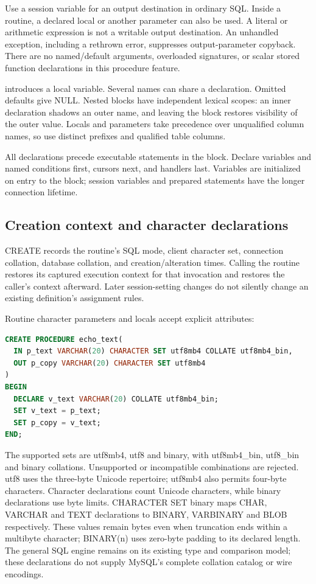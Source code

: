 Use a session variable for an output destination in ordinary SQL. Inside a
routine, a declared local or another parameter can also be used. A literal or
arithmetic expression is not a writable output destination. An unhandled
exception, including a rethrown error, suppresses output-parameter copyback.
There are no named/default arguments, overloaded signatures, or scalar stored
function declarations in this procedure feature.

 introduces a local variable.
Several names can share a declaration. Omitted defaults give NULL. Nested
blocks have independent lexical scopes: an inner declaration shadows an outer
name, and leaving the block restores visibility of the outer value. Locals and
parameters take precedence over unqualified column names, so use distinct
prefixes and qualified table columns.

All declarations precede executable statements in the block. Declare variables
and named conditions first, cursors next, and handlers last. Variables are
initialized on entry to the block; session variables and prepared statements
have the longer connection lifetime.

\subsection{Creation context and character declarations}

CREATE records the routine's SQL mode, client character set, connection
collation, database collation, and creation/alteration times. Calling the
routine restores its captured execution context for that invocation and
restores the caller's context afterward. Later session-setting changes do not
silently change an existing definition's assignment rules.

Routine character parameters and locals accept explicit attributes:
\begin{lstlisting}[language=SQL]
CREATE PROCEDURE echo_text(
  IN p_text VARCHAR(20) CHARACTER SET utf8mb4 COLLATE utf8mb4_bin,
  OUT p_copy VARCHAR(20) CHARACTER SET utf8mb4
)
BEGIN
  DECLARE v_text VARCHAR(20) COLLATE utf8mb4_bin;
  SET v_text = p_text;
  SET p_copy = v_text;
END;
\end{lstlisting}

The supported sets are utf8mb4, utf8 and binary, with utf8mb4\_bin, utf8\_bin
and binary collations. Unsupported or incompatible combinations are rejected.
utf8 uses the three-byte Unicode repertoire; utf8mb4 also permits four-byte
characters. Character declarations count Unicode characters, while binary
declarations use byte limits. CHARACTER SET binary maps CHAR, VARCHAR and
TEXT declarations to BINARY, VARBINARY and BLOB respectively. These values
remain bytes even when truncation ends within a multibyte character; BINARY(n)
uses zero-byte padding to its declared length. The general SQL engine remains on its existing
type and comparison model; these declarations do not supply MySQL's complete
collation catalog or wire encodings.

